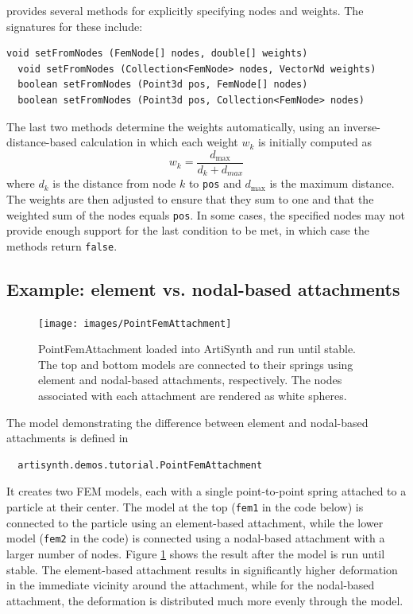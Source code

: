  provides
several methods for explicitly specifying nodes and weights. The
signatures for these include:
\begin{lstlisting}[]
  void setFromNodes (FemNode[] nodes, double[] weights)
  void setFromNodes (Collection<FemNode> nodes, VectorNd weights)
  boolean setFromNodes (Point3d pos, FemNode[] nodes)
  boolean setFromNodes (Point3d pos, Collection<FemNode> nodes)
\end{lstlisting}
The last two methods determine the weights automatically, using an
inverse-distance-based calculation in which each weight $w_k$
is initially computed as
%
\begin{equation}
w_k = \frac{d_{\text{max}}}{d_k + d_{max}}
\label{invDistWeights:eqn}
\end{equation}
%
where $d_k$ is the distance from node $k$ to {\tt pos} and
$d_{\text{max}}$ is the maximum distance. The weights are then
adjusted to ensure that they sum to one and that the weighted sum of
the nodes equals {\tt pos}. In some cases, the specified nodes
may not provide enough support for the last condition to be
met, in which case the methods return {\tt false}.

\subsection{Example: element vs. nodal-based attachments}

\begin{figure}[ht]
\centering
{}
\texttt{[image: images/PointFemAttachment]}
\caption{PointFemAttachment loaded into ArtiSynth and run until stable.
The top and bottom models are connected to their springs using element
and nodal-based attachments, respectively.  The nodes associated with
each attachment are rendered as white spheres.}
\label{fig:fem:pointFemAttachment}
\end{figure}

The model demonstrating the difference between element and
nodal-based attachments is defined in
%
\begin{verbatim}
  artisynth.demos.tutorial.PointFemAttachment
\end{verbatim}
%
It creates two FEM models, each
with a single point-to-point spring attached to a particle at their
center. The model at the top ({\tt fem1} in the code below) is
connected to the particle using an element-based attachment, while the
lower model ({\tt fem2} in the code) is connected using a nodal-based
attachment with a larger number of nodes. Figure
\ref{fig:fem:pointFemAttachment} shows the result after the model is
run until stable. The element-based attachment results in
significantly higher deformation in the immediate vicinity around the
attachment, while for the nodal-based attachment, the deformation is
distributed much more evenly through the model.

